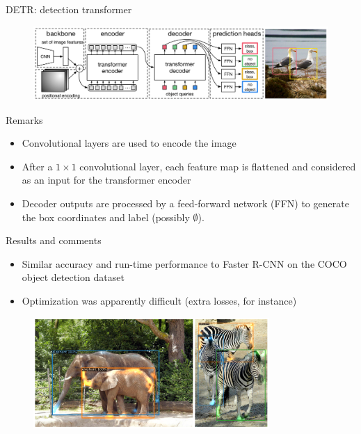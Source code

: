 \documentclass[xcolor=pdftex,dvipsnames,table,mathserif]{beamer}
\begin{document}
\begin{frame}{DETR: detection transformer~\cite{carion_end--end_2020}}

\begin{figure}[ht]
  \centering
  \includegraphics[width=\textwidth]{end_to_end_transformer}
\end{figure}


\begin{block}{Remarks}
  \begin{itemize}
  \item Convolutional layers are used to encode the image
  \item After a $1 \times 1$ convolutional layer, each feature map is flattened and considered as an input for the transformer encoder
  \item Decoder outputs are processed by a feed-forward network (FFN) to generate the box coordinates and label (possibly $\emptyset$).
  \end{itemize}
\end{block}

\end{frame}

\begin{frame}{Results and comments}

\begin{itemize}
\item Similar accuracy and run-time performance to Faster R-CNN on the COCO object detection dataset
\item Optimization was apparently difficult (extra losses, for instance)
\end{itemize}

\begin{figure}[ht]
  \centering
  \includegraphics[width=0.8\textwidth]{detr_attention_scores}
\end{figure}


\end{frame}
\end{document}
